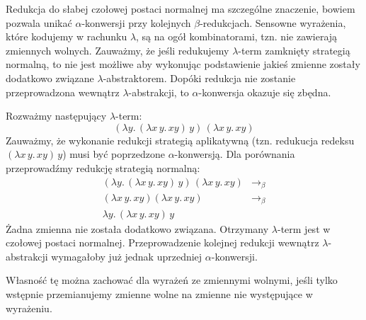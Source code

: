 Redukcja do słabej czołowej postaci normalnej ma szczególne znaczenie, bowiem pozwala unikać \(\alpha\)-konwersji przy kolejnych \(\beta\)-redukcjach. Sensowne wyrażenia, które kodujemy w rachunku \(\lambda\), są na ogół kombinatorami, tzn. nie zawierają zmiennych wolnych. Zauważmy, że jeśli redukujemy \(\lambda\)-term zamknięty strategią normalną, to nie jest możliwe aby wykonując podstawienie jakieś zmienne zostały dodatkowo związane \(\lambda\)-abstraktorem. Dopóki redukcja nie zostanie przeprowadzona wewnątrz \(\lambda\)-abstrakcji, to \(\alpha\)-konwersja okazuje się zbędna.
\begin{przyklad}  
  Rozważmy następujący \(\lambda\)-term:
  \[
    (\lambda y.\, (\lambda x\, y.\,xy)\,y)\,(\lambda x\,y.\,xy)
  \]
  Zauważmy, że wykonanie redukcji strategią aplikatywną (tzn. redukucja redeksu
  \((\lambda x\, y.\,xy)\,y\)) musi być poprzedzone \(\alpha\)-konwersją. Dla porównania przeprowadźmy redukcję strategią normalną:
  \begin{align*}
    (\lambda y.\,(\lambda x\,y.\,xy)\,y)\,(\lambda x\,y.\,xy) &\to_\beta\\
    (\lambda x\,y.\,xy)(\lambda x\,y.\,xy) &\to_\beta \\
    \lambda y.\,(\lambda x\,y.\,xy)\,y &
  \end{align*}
  Żadna zmienna nie została dodatkowo związana. Otrzymany \(\lambda\)-term jest w czołowej postaci normalnej. Przeprowadzenie kolejnej redukcji wewnątrz \(\lambda\)-abstrakcji wymagałoby już jednak uprzedniej \(\alpha\)-konwersji.
\end{przyklad}
Własność tę można zachować dla wyrażeń ze zmiennymi wolnymi, jeśli tylko wstępnie przemianujemy zmienne wolne na zmienne nie występujące w wyrażeniu.
